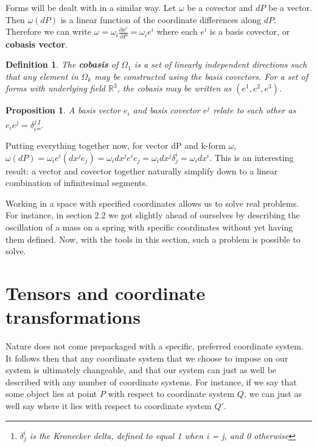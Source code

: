 \documentclass{book}
\newtheorem{defn}[equation]{Definition}
\newtheorem{prop}[equation]{Proposition}
\begin{document}
Forms will be dealt with in a similar way. Let $\omega$ be a covector and $dP$ be a vector. Then $\omega(dP)$ is a linear function of the coordinate differences along $dP$. Therefore we can write $\omega = \omega_i \frac{\partial x^i}{\partial P} = \omega_i e^i$ where each $e^i$ is a basis covector, or \textbf{cobasis vector}. 
\begin{defn}
	The \textbf{cobasis} of $\Omega_1$ is a set of linearly independent directions such that any element in $\Omega_k$ may be constructed using the basis covectors. For a set of forms with underlying field $\mathbb{R}^3$, the cobasis may be written as $(e^1, e^2, e^3)$. 
\end{defn}

\begin{prop}
	A basis vector $e_i$ and basis covector $e^j$ relate to each other as $e_ie^j = \delta^j_i$\footnote{$\delta^i_j$ is the Kronecker delta, defined to equal 1 when i = j, and 0 otherwise}.
\end{prop}
 

Putting everything together now, for vector dP and k-form $\omega$, $\omega(dP) = \omega_ie^i(dx^je_j) = \omega_idx^je^ie_j = \omega_idx^j\delta^i_j = \omega_i dx^i$. This is an interesting result: a vector and covector together naturally simplify down to a linear combination of infinitesimal segments. 

Working in a space with specified coordinates allows us to solve real problems. For instance, in section 2.2 we got slightly ahead of ourselves by describing the oscillation of a mass on a spring with specific coordinates without yet having them defined. Now, with the tools in this section, such a problem is possible to solve.  



\section{Tensors and coordinate transformations}


Nature does not come prepackaged with a specific, preferred coordinate system. It follows then that any coordinate system that we choose to impose on our system is ultimately changeable, and that our system can just as well be described with any number of coordinate systems. For instance, if we say that some object lies at point $P$ with respect to coordinate system $Q$, we can just as well say where it lies with respect to coordinate system $Q'$. 
\end{document}
